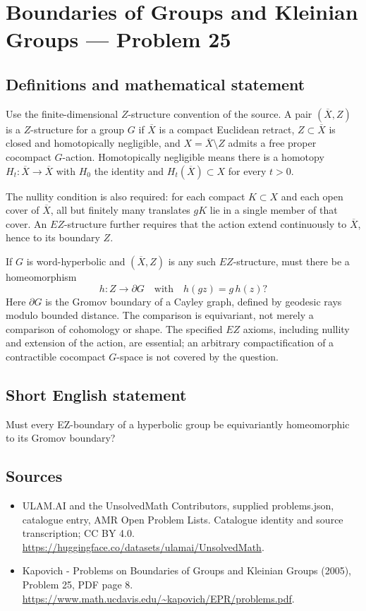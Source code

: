 \documentclass[11pt,a4paper]{article}
\begin{document}
\section*{Boundaries of Groups and Kleinian Groups — Problem 25}\label{statement}

\subsection{Definitions and mathematical statement}
Use the finite-dimensional $Z$-structure convention of the source. A pair $(\overline X,Z)$ is a $Z$-structure for a group $G$ if $\overline X$ is a compact Euclidean retract, $Z\subset\overline X$ is closed and homotopically negligible, and $X=\overline X\setminus Z$ admits a free proper cocompact $G$-action. Homotopically negligible means there is a homotopy $H_t:\overline X\to\overline X$ with $H_0$ the identity and $H_t(\overline X)\subset X$ for every $t>0$.

The nullity condition is also required: for each compact $K\subset X$ and each open cover of $\overline X$, all but finitely many translates $gK$ lie in a single member of that cover. An $EZ$-structure further requires that the action extend continuously to $\overline X$, hence to its boundary $Z$.

If $G$ is word-hyperbolic and $(\overline X,Z)$ is any such $EZ$-structure, must there be a homeomorphism
\[
 h:Z\longrightarrow\partial G\quad\text{with}\quad h(gz)=g\,h(z)?
\]
Here $\partial G$ is the Gromov boundary of a Cayley graph, defined by geodesic rays modulo bounded distance. The comparison is equivariant, not merely a comparison of cohomology or shape. The specified $EZ$ axioms, including nullity and extension of the action, are essential; an arbitrary compactification of a contractible cocompact $G$-space is not covered by the question.
\subsection{Short English statement}
Must every EZ-boundary of a hyperbolic group be equivariantly homeomorphic to its Gromov boundary?
\subsection{Sources}
\begin{itemize}
\item[S1] ULAM.AI and the UnsolvedMath Contributors, supplied problems.json, catalogue entry, AMR Open Problem Lists. Catalogue identity and source transcription; CC BY 4.0.
\url{https://huggingface.co/datasets/ulamai/UnsolvedMath}.
\item[S2] Kapovich - Problems on Boundaries of Groups and Kleinian Groups (2005), Problem 25, PDF page 8. 
\url{https://www.math.ucdavis.edu/~kapovich/EPR/problems.pdf}.
\end{itemize}
\end{document}
